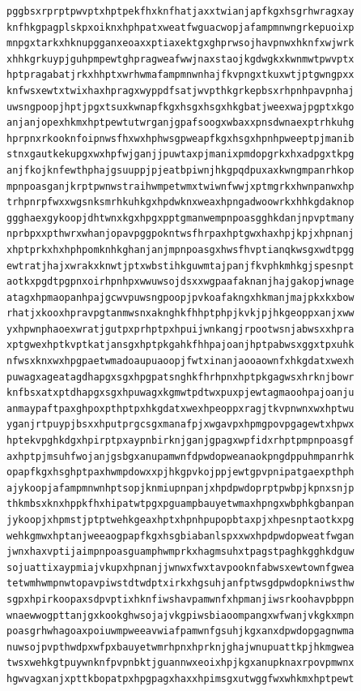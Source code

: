 \documentclass[11pt,letterpaper]{exam}
\begin{document}
\begin{questions}
\begin{verbatim}
pggbsxrprptpwvptxhptpekfhxknfhatjaxxtwianjapfkgxhsgrhwragxay
knfhkgpagplskpxoiknxhphpatxweatfwguacwopjafampmnwngrkepuoixp
mnpgxtarkxhknupgganxeoaxxptiaxektgxghprwsojhavpnwxhknfxwjwrk
xhhkgrkuypjguhpmpewtghpragweafwwjnaxstaojkgdwgkxkwnmwtpwvptx
hptpragabatjrkxhhptxwrhwmafampmnwnhajfkvpngxtkuxwtjptgwngpxx
knfwsxewtxtwixhaxhpragxwyppdfsatjwvpthkgrkepbsxrhpnhpavpnhaj
uwsngpoopjhptjpgxtsuxkwnapfkgxhsgxhsgxhkgbatjweexwajpgptxkgo
anjanjopexhkmxhptpewtutwrganjgpafsoogxwbaxxpnsdwnaexptrhkuhg
hprpnxrkooknfoipnwsfhxwxhphwsgpweapfkgxhsgxhpnhpweeptpjmanib
stnxgautkekupgxwxhpfwjganjjpuwtaxpjmanixpmdopgrkxhxadpgxtkpg
anjfkojknfewthphajgsuuppjpjeatbpiwnjhkgpqdpuxaxkwngmpanrhkop
mpnpoasganjkrptpwnwstraihwmpetwmxtwiwnfwwjxptmgrkxhwnpanwxhp
trhpnrpfwxxwgsnksmrhkuhkgxhpdwknxweaxhpngadwoowrkxhhkgdaknop
ggghaexgykoopjdhtwnxkgxhpgxpptgmanwempnpoasgghkdanjnpvptmany
nprbpxxpthwrxwhanjopavpggpokntwsfhrpaxhptgwxhaxhpjkpjxhpnanj
xhptprkxhxhphpomknhkghanjanjmpnpoasgxhwsfhvptianqkwsgxwdtpgg
ewtratjhajxwrakxknwtjptxwbstihkguwmtajpanjfkvphkmhkgjspesnpt
aotkxpgdtpgpnxoirhpnhpxwwuwsojdsxxwgpaafaknanjhajgakopjwnage
atagxhpmaopanhpajgcwvpuwsngpoopjpvkoafakngxhkmanjmajpkxkxbow
rhatjxkooxhpravpgtanmwsnxaknghkfhhptphpjkvkjpjhkgeoppxanjxww
yxhpwnphaoexwratjgutpxprhptpxhpuijwnkangjrpootwsnjabwsxxhpra
xptgwexhptkvptkatjansgxhptpkgahkfhhpajoanjhptpabwsxggxtpxuhk
nfwsxknxwxhpgpaetwmadoaupuaoopjfwtxinanjaooaownfxhkgdatxwexh
puwagxageatagdhapgxsgxhpgpatsnghkfhrhpnxhptpkgagwsxhrknjbowr
knfbsxatxptdhapgxsgxhpuwagxkgmwtpdtwxpuxpjewtagmaoohpajoanju
anmaypaftpaxghpoxpthptpxhkgdatxwexhpeoppxragjtkvpnwnxwxhptwu
yganjrtpuypjbsxxhputprgcsgxmanafpjxwgavpxhpmgpovpgagewtxhpwx
hptekvpghkdgxhpirptpxaypnbirknjganjgpagxwpfidxrhptpmpnpoasgf
axhptpjmsuhfwojanjgsbgxanupamwnfdpwdopweanaokpngdppuhmpanrhk
opapfkgxhsghptpaxhwmpdowxxpjhkgpvkojppjewtgpvpnipatgaexpthph
ajykoopjafampmnwnhptsopjknmiupnpanjxhpdpwdoprptpwbpjkpnxsnjp
thkmbsxknxhppkfhxhipatwtpgxpguampbauyetwmaxhpngxwbphkgbanpan
jykoopjxhpmstjptptwehkgeaxhptxhpnhpupopbtaxpjxhpesnptaotkxpg
wehkgmwxhptanjweeaogpapfkgxhsgbiabanlspxxwxhpdpwdopweatfwgan
jwnxhaxvptijaimpnpoasguamphwmprkxhagmsuhxtpagstpaghkgghkdguw
sojuattixaypmiajvkupxhpnanjjwnwxfwxtavpooknfabwsxewtownfgwea
tetwmhwmpnwtopavpiwstdtwdptxirkxhgsuhjanfptwsgdpwdopkniwsthw
sgpxhpirkoopaxsdpvptixhknfiwshavpamwnfxhpmanjiwsrkoohavpbppn
wnaewwogpttanjgxkookghwsojajvkgpiwsbiaoompangxwfwanjvkgkxmpn
poasgrhwhagoaxpoiuwmpweeavwiafpamwnfgsuhjkgxanxdpwdopgagnwma
nuwsojpvpthwdpxwfpxbauyetwmrhpnxhprknjghajwnupuattkpjhkmgwea
twsxwehkgtpuywnknfpvpnbktjguannwxeoixhpjkgxanupknaxrpovpmwnx
hgwvagxanjxpttkbopatpxhpgpagxhaxxhpimsgxutwggfwxwhkmxhptpewt

\end{verbatim}
\end{questions}
\end{document}
